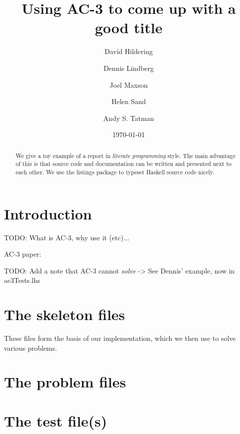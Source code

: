 \documentclass[12pt,a4paper]{article}
\title{Using AC-3 to come up with a good title}
\author{David Hildering \and Dennis Lindberg \and Joel Maxson \and Helen Sand \and Andy S. Tatman}
\date{\today}
\begin{document}
\maketitle

\begin{abstract}
We give a toy example of a report in \emph{literate programming} style.
The main advantage of this is that source code and documentation can
be written and presented next to each other.
We use the listings package to typeset Haskell source code nicely.
\end{abstract}

\vfill

\tableofcontents

\clearpage


% 

\section{Introduction}
TODO: What is AC-3, why use it (etc)...

AC-3 paper: \cite{AC3}

TODO: Add a note that AC-3 cannot \emph{solve} -> See Dennis' example, now in ac3Tests.lhs

\section{The skeleton files}
These files form the basis of our implementation, which we then use to solve various problems.





\section{The problem files} %












\section{The test file(s)}







\end{document}
